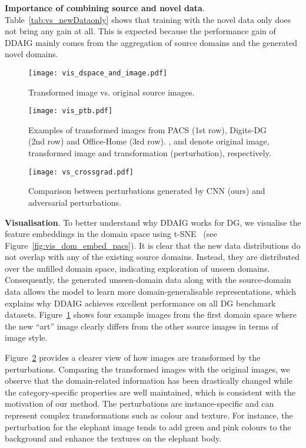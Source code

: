 \documentclass[letterpaper]{article}
\newcommand{\keypoint}[1]{\vspace{0.1cm}\noindent\textbf{#1}}
\begin{document}
\keypoint{Importance of combining source and novel data}.
Table~\ref{tab:vs_newDataonly} shows that training with the novel data only does not bring any gain at all. This is expected because the performance gain of DDAIG mainly comes from the aggregation of source domains and the generated novel domains.


\begin{figure}[t]
\centering
\texttt{[image: vis\_dspace\_and\_image.pdf]}
\caption{\small Transformed image vs. original source images.}
\label{fig:vis_dspace_and_image}
\vspace{-0.2cm}
\end{figure}

\begin{figure}[t]
\centering
\texttt{[image: vis\_ptb.pdf]}
\caption{\small Examples of transformed images from PACS (1st row), Digits-DG (2nd row) and Office-Home (3rd row). ,  and  denote original image, transformed image and transformation (perturbation), respectively.}
\label{fig:vis_ptb}
\vspace{-0.3cm}
\end{figure}

\begin{figure}[t]
\centering
\texttt{[image: vs\_crossgrad.pdf]}
\caption{\small Comparison between perturbations generated by CNN (ours) and adversarial perturbations.}
\label{fig:vs_crossgrad}
\vspace{-0.2cm}
\end{figure}


\keypoint{Visualisation}.
To better understand why DDAIG works for DG, we visualise the feature embeddings in the domain space using t-SNE~\cite{tsne} (see Figure~\ref{fig:vis_dom_embed_pacs}). It is clear that the new data distributions do not overlap with any of the existing source domains. Instead, they are distributed over the unfilled domain space, indicating exploration of unseen domains. Consequently, the generated unseen-domain data along with the source-domain data allows the model to learn more domain-generalisable representations, which explains why DDAIG achieves excellent performance on all DG benchmark datasets. Figure~\ref{fig:vis_dspace_and_image} shows four example images from the first domain space where the new ``art'' image clearly differs from the other source images in terms of image style.

Figure~\ref{fig:vis_ptb} provides a clearer view of how images are transformed by the perturbations. Comparing the transformed images with the original images, we observe that the domain-related information has been drastically changed while the category-specific properties are well maintained, which is consistent with the motivation of our method. The perturbations are instance-specific and can represent complex transformations such as colour and texture. For instance, the perturbation for the elephant image tends to add green and pink colours to the background and enhance the textures on the elephant body.
\end{document}
